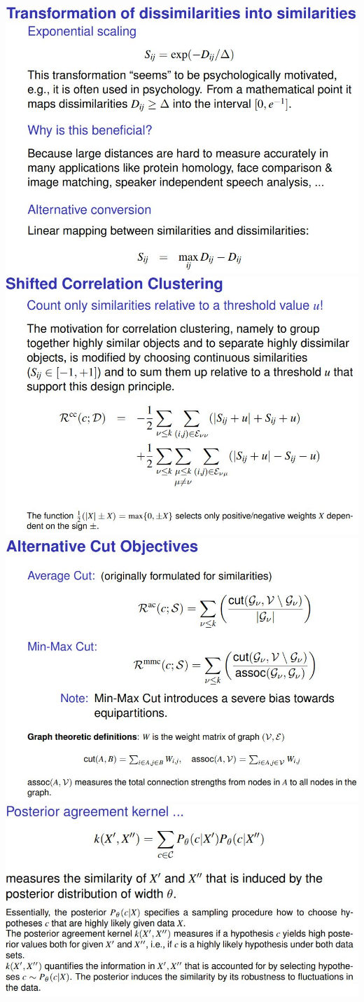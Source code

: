 \documentclass[9pt,parskip]{scrartcl}
\begin{document}
\begin{multicols*}{4}
\begin{center}
\includegraphics[width=0.8\linewidth]{pictures/similaritiesToDissimilarities.jpg}
\includegraphics[width=0.8\linewidth]{pictures/SCC.jpg}
\includegraphics[width=0.8\linewidth]{pictures/alternativeCuts.jpg}
\includegraphics[width=0.8\linewidth]{pictures/posteriorAgreement.jpg}

\end{center}
\end{multicols*}
\end{document}
